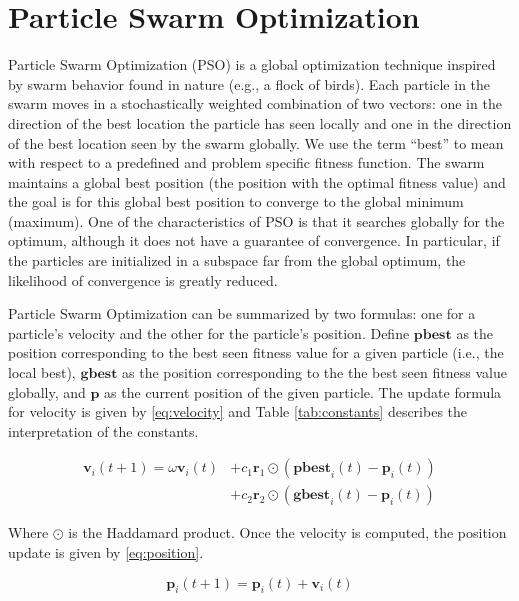 \section{Particle Swarm Optimization}\label{sec:pso}
Particle Swarm Optimization (PSO) \cite{pso} is a global optimization technique
inspired by swarm behavior found in nature (e.g., a flock of birds).
Each particle in the swarm moves in a stochastically weighted
combination of two vectors: one in the direction of the best location the
particle has seen locally and one in the direction of the best location seen by
the swarm globally. We use the term ``best'' to mean with respect to a predefined and
problem specific fitness function.
The swarm maintains a global best position (the position
with the optimal fitness value) and the goal is for this global best position to
converge to the global minimum (maximum).
One of the characteristics of PSO is that it searches globally for the optimum,
although it does not have a guarantee of convergence.
In particular, if the particles are initialized in a subspace far from the
global optimum, the likelihood of convergence is greatly reduced.

Particle Swarm Optimization can be summarized by two formulas:
one for a particle's velocity and the other for the particle's position. Define
$\textbf{pbest}$ as the position corresponding to the best seen fitness value
for a given particle (i.e., the local best), $\textbf{gbest}$ as the position
corresponding to the the best seen fitness value globally, and $\textbf{p}$ as
the current position of the given particle. The update formula for velocity is
given by \eqref{eq:velocity} and Table \ref{tab:constants} describes
the interpretation of the constants.

\begin{equation}\label{eq:velocity}
\begin{aligned}
  \textbf{v}_i(t+1) = \omega \textbf{v}_i (t) & +
                                                c_1 \textbf{r}_1\odot (\textbf{pbest}_i(t) -
                                                \textbf{p}_i(t))
  \\
  &+ c_2 \textbf{r}_2 \odot(\textbf{gbest}_i(t) - \textbf{p}_i(t))
\end{aligned}
\end{equation}

Where $\odot$ is the Haddamard product.
Once the velocity is computed, the position update is given by
\eqref{eq:position}.

\begin{equation}\label{eq:position}
  \textbf{p}_i(t+1) = \textbf{p}_i(t) + \textbf{v}_i(t)
\end{equation}

